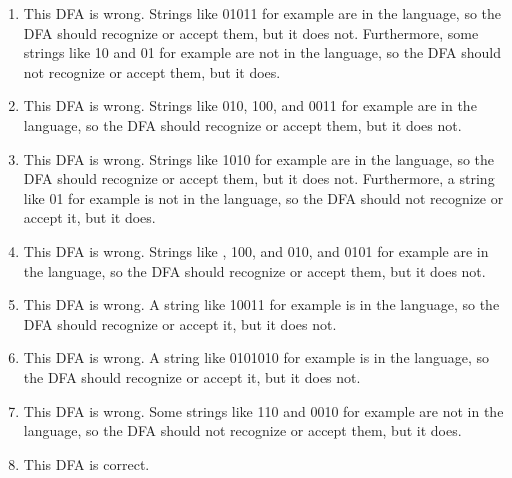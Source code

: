 \documentclass[11pt]{article}
\begin{document}
\begin{enumerate}
          \vspace{-1.5mm}

          \begin{enumerate}

            \addtolength{\itemsep}{3mm}

            \item This DFA is wrong.  Strings like 01011 for example are in
                  the language, so the DFA should recognize or accept them,
                  but it does not.  Furthermore, some strings like 10 and 01
                  for example are not in the language, so the DFA should not
                  recognize or accept them, but it does.

            \item This DFA is wrong.  Strings like 010, 100, and 0011 for
                  example are in the language, so the DFA should recognize
                  or accept them, but it does not.

            \item This DFA is wrong.  Strings like 1010 for example are in
                  the language, so the DFA should recognize or accept them,
                  but it does not.  Furthermore, a string like 01 for
                  example is not in the language, so the DFA should not
                  recognize or accept it, but it does.

            \item This DFA is wrong.  Strings like \largeepsilon, 100, and 010,
                  and 0101 for example are in the language, so the DFA
                  should recognize or accept them, but it does not.

            \item This DFA is wrong.  A string like 10011 for example is in
                  the language, so the DFA should recognize or accept it,
                  but it does not.

            \item This DFA is wrong.  A string like 0101010 for example is
                  in the language, so the DFA should recognize or accept it,
                  but it does not.

            \item This DFA is wrong.  Some strings like 110 and 0010 for
                  example are not in the language, so the DFA should not
                  recognize or accept them, but it does.

            \item This DFA is correct.

          \end{enumerate}

  \end{enumerate}
\end{document}
